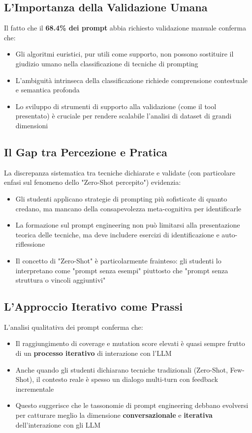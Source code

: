\documentclass[a4paper,12pt]{article}
\begin{document}
\subsection{L'Importanza della Validazione Umana}
Il fatto che il \textbf{68.4\% dei prompt} abbia richiesto validazione manuale conferma che:
\begin{itemize}
    \item Gli algoritmi euristici, pur utili come supporto, non possono sostituire il giudizio umano nella classificazione di tecniche di prompting
    \item L'ambiguità intrinseca della classificazione richiede comprensione contestuale e semantica profonda
    \item Lo sviluppo di strumenti di supporto alla validazione (come il tool presentato) è cruciale per rendere scalabile l'analisi di dataset di grandi dimensioni
\end{itemize}

\subsection{Il Gap tra Percezione e Pratica}
La discrepanza sistematica tra tecniche dichiarate e validate (con particolare enfasi sul fenomeno dello "Zero-Shot percepito") evidenzia:
\begin{itemize}
    \item Gli studenti applicano strategie di prompting più sofisticate di quanto credano, ma mancano della consapevolezza meta-cognitiva per identificarle
    \item La formazione sul prompt engineering non può limitarsi alla presentazione teorica delle tecniche, ma deve includere esercizi di identificazione e auto-riflessione
    \item Il concetto di "Zero-Shot" è particolarmente frainteso: gli studenti lo interpretano come "prompt senza esempi" piuttosto che "prompt senza struttura o vincoli aggiuntivi"
\end{itemize}

\subsection{L'Approccio Iterativo come Prassi}
L'analisi qualitativa dei prompt conferma che:
\begin{itemize}
    \item Il raggiungimento di coverage e mutation score elevati è quasi sempre frutto di un \textbf{processo iterativo} di interazione con l'LLM
    \item Anche quando gli studenti dichiarano tecniche tradizionali (Zero-Shot, Few-Shot), il contesto reale è spesso un dialogo multi-turn con feedback incrementale
    \item Questo suggerisce che le tassonomie di prompt engineering debbano evolversi per catturare meglio la dimensione \textbf{conversazionale} e \textbf{iterativa} dell'interazione con gli LLM
\end{itemize}
\end{document}
